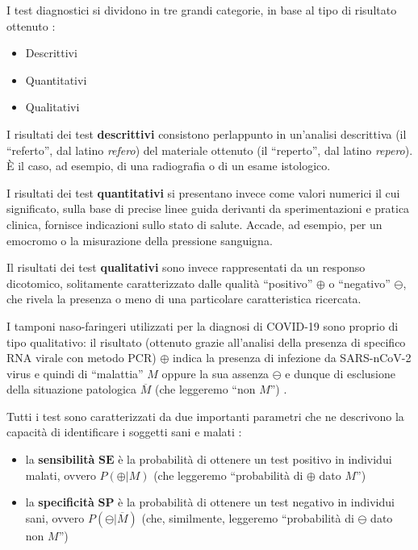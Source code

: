\documentclass[11pt]{article}
\providecommand{\tightlist}{%
      \setlength{\itemsep}{0pt}\setlength{\parskip}{0pt}}
\begin{document}
I test diagnostici si dividono in tre grandi categorie, in base al tipo
di risultato ottenuto \cite{porta2014dictionary}:

\begin{itemize}
\tightlist
\item
  Descrittivi
\item
  Quantitativi
\item
  Qualitativi
\end{itemize}

I risultati dei test \textbf{descrittivi} consistono perlappunto in
un'analisi descrittiva (il ``referto'', dal latino \emph{refero}) del
materiale ottenuto (il ``reperto'', dal latino \emph{repero}). È il
caso, ad esempio, di una radiografia o di un esame istologico.

I risultati dei test \textbf{quantitativi} si presentano invece come
valori numerici il cui significato, sulla base di precise linee guida
derivanti da sperimentazioni e pratica clinica, fornisce indicazioni
sullo stato di salute. Accade, ad esempio, per un emocromo o la
misurazione della pressione sanguigna.

Il risultati dei test \textbf{qualitativi} sono invece rappresentati da
un responso dicotomico, solitamente caratterizzato dalle qualità
``positivo'' \(\oplus\) o ``negativo'' \(\ominus\), che rivela la
presenza o meno di una particolare caratteristica ricercata.

I tamponi naso-faringeri utilizzati per la diagnosi di COVID-19 sono
proprio di tipo qualitativo: il risultato (ottenuto grazie all'analisi
della presenza di specifico RNA virale con metodo PCR) \(\oplus\) indica
la presenza di infezione da SARS-nCoV-2 virus e quindi di ``malattia''
\(M\) oppure la sua assenza \(\ominus\) e dunque di esclusione della
situazione patologica \(\overline{M}\) (che leggeremo ``non \(M\)'')
\cite{padhye2020reconstructed}.

Tutti i test sono caratterizzati da due importanti parametri che ne
descrivono la capacità di identificare i soggetti sani e malati
\cite{porta2014dictionary}:

\begin{itemize}
\tightlist
\item
  la \textbf{sensibilità} \(\mathbf{SE}\) è la probabilità di ottenere
  un test positivo in individui malati, ovvero \(P(\oplus|M)\) (che
  leggeremo ``probabilità di \(\oplus\) dato \(M\)'')
\item
  la \textbf{specificità} \(\mathbf{SP}\) è la probabilità di ottenere
  un test negativo in individui sani, ovvero \(P(\ominus|\overline{M})\)
  (che, similmente, leggeremo ``probabilità di \(\ominus\) dato non
  \(M\)'')
\end{itemize}
\end{document}
